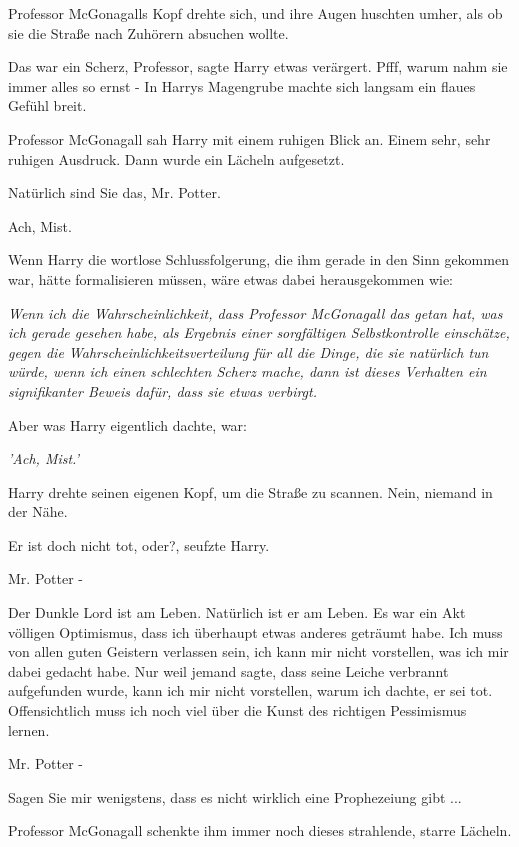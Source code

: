 Professor McGonagalls Kopf drehte sich, und ihre Augen huschten umher, als ob
sie die Straße nach Zuhörern absuchen wollte.

\glqq{}Das war ein Scherz, Professor\grqq{}, sagte Harry etwas verärgert. Pfff,
warum nahm sie immer alles so ernst - In Harrys Magengrube machte sich langsam
ein flaues Gefühl breit.

Professor McGonagall sah Harry mit einem ruhigen Blick an. Einem sehr, sehr
ruhigen Ausdruck. Dann wurde ein Lächeln aufgesetzt.

\glqq{}Natürlich sind Sie das, Mr. Potter.\grqq{}

Ach, Mist.

Wenn Harry die wortlose Schlussfolgerung, die ihm gerade in den Sinn gekommen
war, hätte formalisieren müssen, wäre etwas dabei herausgekommen wie:

\glqq{}\emph{Wenn ich die Wahrscheinlichkeit, dass Professor McGonagall das
getan hat, was ich gerade gesehen habe, als Ergebnis einer sorgfältigen
Selbstkontrolle einschätze, gegen die Wahrscheinlichkeitsverteilung für all die
Dinge, die sie natürlich tun würde, wenn ich einen schlechten Scherz mache, dann
ist dieses Verhalten ein signifikanter Beweis dafür, dass sie etwas
verbirgt.\grqq{}}

Aber was Harry eigentlich dachte, war:

\emph{'Ach, Mist.'}

Harry drehte seinen eigenen Kopf, um die Straße zu scannen. Nein, niemand in der
Nähe.

\glqq{}Er ist doch nicht tot, oder?\grqq{}, seufzte Harry.

\glqq{}Mr. Potter -\grqq{}

\glqq{}Der Dunkle Lord ist am Leben. Natürlich ist er am Leben. Es war ein Akt
völligen Optimismus, dass ich überhaupt etwas anderes geträumt habe. Ich muss
von allen guten Geistern verlassen sein, ich kann mir nicht vorstellen, was ich
mir dabei gedacht habe. Nur weil jemand sagte, dass seine Leiche verbrannt
aufgefunden wurde, kann ich mir nicht vorstellen, warum ich dachte, er sei tot.
Offensichtlich muss ich noch viel über die Kunst des richtigen Pessimismus
lernen.\grqq{}

\glqq{}Mr. Potter -\grqq{}

\glqq{}Sagen Sie mir wenigstens, dass es nicht wirklich eine Prophezeiung
gibt ...\grqq{}

Professor McGonagall schenkte ihm immer noch dieses strahlende, starre Lächeln.

